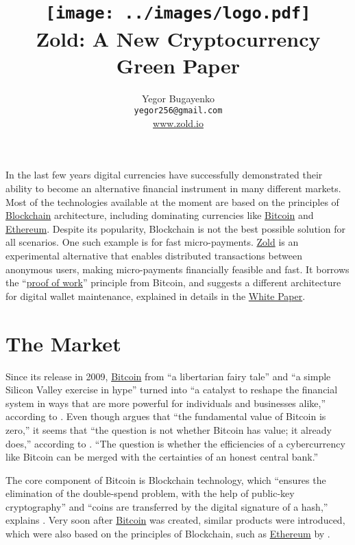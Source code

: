 \documentclass[12pt,oneside]{article}
\title{\texttt{[image: ../images/logo.pdf]}\\Zold: A New Cryptocurrency\\\colorbox{green!30}{Green Paper}}
\author{Yegor Bugayenko\\
  \texttt{yegor256@gmail.com}\\
  \href{https://www.zold.io}{www.zold.io}\\[1em]
  \href{https://github.com/zold-io/papers/releases/tag/\zoldversion}{\texttt{\zoldversion}}}
\begin{document}
\raggedbottom

\maketitle

In the last few years digital currencies have successfully demonstrated
their ability to become an alternative financial instrument in many
different markets. Most of the technologies available at the moment are
based on the principles of \href{https://en.wikipedia.org/wiki/Blockchain}{Blockchain} architecture, including
dominating currencies like \href{https://bitcoin.org/}{Bitcoin} and
\href{https://ethereum.org/}{Ethereum}. Despite its
popularity, Blockchain is not the best possible solution for all scenarios.
One such example is for fast micro-payments.
\href{https://www.zold.io}{Zold} is an experimental alternative
that enables distributed transactions between
anonymous users, making micro-payments financially feasible and fast.
It borrows the ``\href{https://en.wikipedia.org/wiki/Proof-of-work_system}{proof of work}'' principle from Bitcoin,
and suggests a different architecture for digital wallet maintenance,
explained in details in the \href{https://papers.zold.io}{White Paper}.

\pagebreak

\section*{The Market}

Since its release in 2009, \href{https://bitcoin.org/}{Bitcoin} from
``a libertarian fairy tale'' and ``a simple Silicon Valley exercise in hype''
turned into ``a catalyst to reshape the financial system in ways that are more
powerful for individuals and businesses alike,'' according to .
Even though  argues that
``the fundamental value of Bitcoin is zero,''
it seems that ``the question is not whether Bitcoin has value; it already does,''
according to .
``The question is whether the efficiencies of a cybercurrency
like Bitcoin can be merged with the certainties of an honest central bank.''

The core component of Bitcoin is Blockchain technology, which
``ensures the elimination of the double-spend problem, with the help
of public-key cryptography'' and ``coins are transferred by the
digital signature of a hash,''
explains .
Very soon after \href{https://bitcoin.org/}{Bitcoin} was created, similar products were introduced,
which were also based on the principles of Blockchain, such as
\href{https://ethereum.org/}{Ethereum} by .
\end{document}
